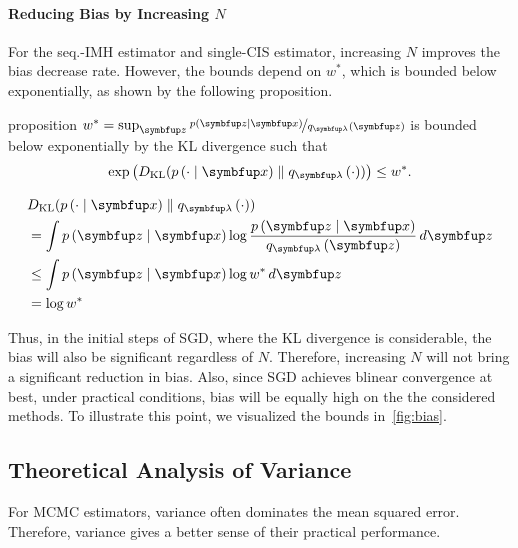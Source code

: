 \paragraph{Reducing Bias by Increasing \(N\)}
For the seq.-IMH estimator and single-CIS estimator, increasing \(N\) improves the bias decrease rate.
However, the bounds depend on \(w^*\), which is bounded below exponentially, as shown by the following proposition.
%
\begin{theoremEnd}{proposition}\label{thm:kl_bound}
  \(w^* = \sup_{\vz} \nicefrac{p\left(\vz\mid\vx\right)}{q_{\vlambda}\left(\vz\right)} \) is bounded below exponentially by the KL divergence such that
  \[
  \exp\left(\DKL{p\left(\cdot\mid\vx\right)}{ q_{\vlambda}\left(\cdot\right) }\right) \leq w^*.
  \]
\end{theoremEnd}
\vspace{-0.1in}
\begin{proofEnd}
  \begin{align*}
    &\DKL{p\left(\cdot\mid\vx\right)}{ q_{\vlambda}\left(\cdot\right) } \\
    &= \int p\left(\vz\mid\vx\right) \log \frac{p\left(\vz\mid\vx\right)}{q_{\vlambda}\left(\vz\right)}\,d\vz \\
    &\leq \int p\left(\vz\mid\vx\right) \log w^* \, d\vz \\
    &= \log w^*
  \end{align*}
\end{proofEnd}

Thus, in the initial steps of SGD, where the KL divergence is considerable, the bias will also be significant regardless of \(N\).
Therefore, increasing \(N\) will not bring a significant reduction in bias.
Also, since SGD achieves blinear convergence at best, under practical conditions, bias will be equally high on the the considered methods.
To illustrate this point, we visualized the bounds in~\cref{fig:bias}.

\vspace{-0.05in}
\subsection{Theoretical Analysis of Variance}
For MCMC estimators, variance often dominates the mean squared error.
Therefore, variance gives a better sense of their practical performance.

\vspace{-0.1in}
